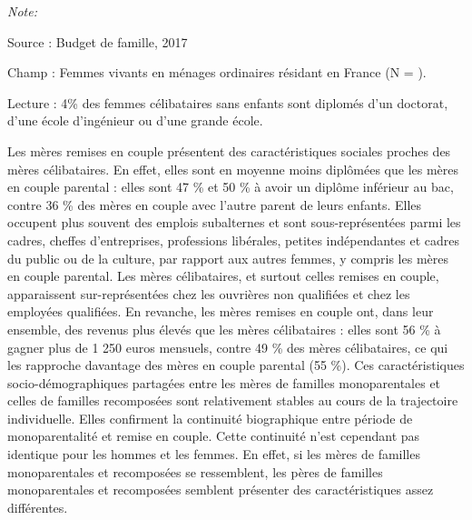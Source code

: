 \documentclass[
  12pt,
]{book}
\begin{document}
\begin{table}[!h]
{\begin{threeparttable}
\begin{tablenotes}
\item \textit{Note: } 
\item Source : Budget de famille, 2017
\item Champ : Femmes vivants en ménages ordinaires résidant en France (N = ).
\item Lecture : 4\% des femmes célibataires sans enfants sont diplomés d'un doctorat, d'une école d'ingénieur ou d'une grande école.
\end{tablenotes}
\end{threeparttable}}
\end{table}

Les mères remises en couple présentent des caractéristiques sociales
proches des mères célibataires. En effet, elles sont en moyenne moins
diplômées que les mères en couple parental : elles sont 47 \% et 50 \% à
avoir un diplôme inférieur au bac, contre 36 \% des mères en couple avec
l'autre parent de leurs enfants. Elles occupent plus souvent des emplois
subalternes et sont sous-représentées parmi les cadres, cheffes
d'entreprises, professions libérales, petites indépendantes et cadres du
public ou de la culture, par rapport aux autres femmes, y compris les
mères en couple parental. Les mères célibataires, et surtout celles
remises en couple, apparaissent sur-représentées chez les ouvrières non
qualifiées et chez les employées qualifiées. En revanche, les mères
remises en couple ont, dans leur ensemble, des revenus plus élevés que
les mères célibataires : elles sont 56 \% à gagner plus de 1 250 euros
mensuels, contre 49 \% des mères célibataires, ce qui les rapproche
davantage des mères en couple parental (55 \%). Ces caractéristiques
socio-démographiques partagées entre les mères de familles
monoparentales et celles de familles recomposées sont relativement
stables au cours de la trajectoire individuelle. Elles confirment la
continuité biographique entre période de monoparentalité et remise en
couple. Cette continuité n'est cependant pas identique pour les hommes
et les femmes. En effet, si les mères de familles monoparentales et
recomposées se ressemblent, les pères de familles monoparentales et
recomposées semblent présenter des caractéristiques assez différentes.
\end{document}

